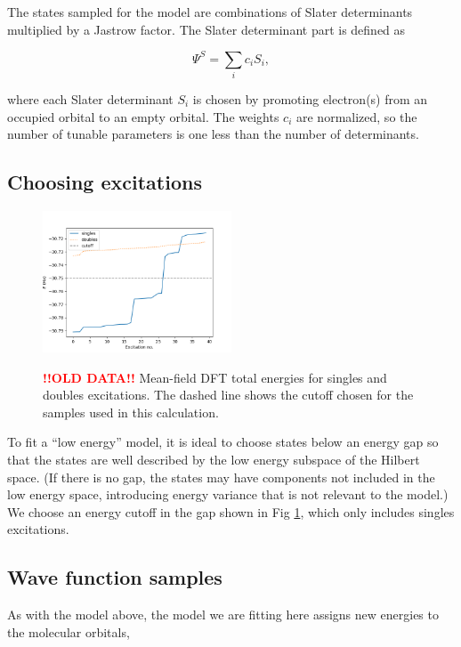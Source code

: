 The states sampled for the model are combinations of Slater determinants multiplied by a Jastrow factor.
The Slater determinant part is defined as

\begin{equation}
\Psi^S = \sum_i c_i S_i,
\end{equation}

where each Slater determinant $S_i$ is chosen by promoting electron(s) from an occupied orbital to an empty orbital.
The weights $c_i$ are normalized, so the number of tunable parameters is one less than the number of determinants.


\subsection{Choosing excitations}

\begin{figure}[h!]
\includegraphics[width=0.5\textwidth]{images/determinant_mf_energies.png}
\label{fig:energy_cutoff}
\caption{\textcolor{red}{\bf !!OLD DATA!!} Mean-field DFT total energies for singles and doubles excitations.
The dashed line shows the cutoff chosen for the samples used in this calculation.}
\end{figure}

To fit a ``low energy'' model, it is ideal to choose states below an energy gap so that the states are well described by the low energy subspace of the Hilbert space.
(If there is no gap, the states may have components not included in the low energy space, introducing energy variance that is not relevant to the model.)
We choose an energy cutoff in the gap shown in Fig \ref{fig:energy_cutoff}, which only includes singles excitations.

\subsection{Wave function samples}

As with the model above, the model we are fitting here assigns new energies to the molecular orbitals,

